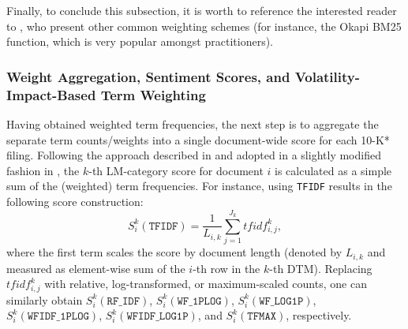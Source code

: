 
Finally, to conclude this subsection, it is worth to reference the interested reader to \textcite{ZobelMoffat_termweights_1998}, who present other common weighting schemes (for instance, the Okapi BM25 function, which is very popular amongst practitioners).

\subsubsection{Weight Aggregation, Sentiment Scores, and Volatility-Impact-Based Term Weighting}
\label{sssec: senti_sscores}

Having obtained weighted term frequencies, the next step is to aggregate the separate term counts/weights into a single document-wide score for each 10-K* filing. Following the approach described in \textcite{ManningSchutze_IR_2008} and adopted in a slightly modified fashion in \textcite{Jegadeesh2013}, the $k$-th LM-category score for document $i$ is calculated as a simple sum of the (weighted) term frequencies. For instance, using \texttt{TFIDF} results in the following score construction:
\begin{equation}
S_i^k(\texttt{TFIDF}) = \dfrac{1}{L_{i,k}} \sum_{j=1}^{J_{k}} tfidf_{i,j}^k, 
\end{equation}
where the first term scales the score by document length (denoted by $L_{i,k}$ and measured as element-wise sum of the $i$-th row in the $k$-th DTM). Replacing $tfidf_{i,j}^k$ with relative, log-transformed, or maximum-scaled counts, one can similarly obtain $S_i^k(\texttt{RF\_IDF})$, $S_i^k(\texttt{WF\_1PLOG})$, $S_i^k(\texttt{WF\_LOG1P})$, $S_i^k(\texttt{WFIDF\_1PLOG})$, $S_i^k(\texttt{WFIDF\_LOG1P})$, and $S_i^k(\texttt{TFMAX})$, respectively.

